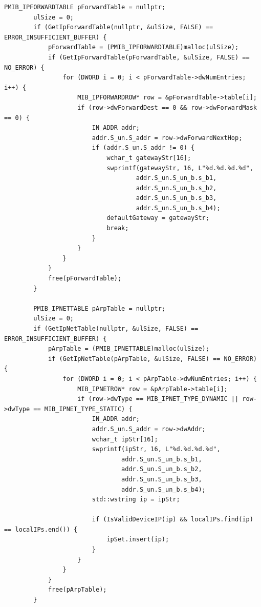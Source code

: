 \begin{lstlisting}[style=CodeListing]
        PMIB_IPFORWARDTABLE pForwardTable = nullptr;
        ulSize = 0;
        if (GetIpForwardTable(nullptr, &ulSize, FALSE) == ERROR_INSUFFICIENT_BUFFER) {
            pForwardTable = (PMIB_IPFORWARDTABLE)malloc(ulSize);
            if (GetIpForwardTable(pForwardTable, &ulSize, FALSE) == NO_ERROR) {
                for (DWORD i = 0; i < pForwardTable->dwNumEntries; i++) {
                    MIB_IPFORWARDROW* row = &pForwardTable->table[i];
                    if (row->dwForwardDest == 0 && row->dwForwardMask == 0) {
                        IN_ADDR addr;
                        addr.S_un.S_addr = row->dwForwardNextHop;
                        if (addr.S_un.S_addr != 0) {
                            wchar_t gatewayStr[16];
                            swprintf(gatewayStr, 16, L"%d.%d.%d.%d",
                                    addr.S_un.S_un_b.s_b1,
                                    addr.S_un.S_un_b.s_b2,
                                    addr.S_un.S_un_b.s_b3,
                                    addr.S_un.S_un_b.s_b4);
                            defaultGateway = gatewayStr;
                            break;
                        }
                    }
                }
            }
            free(pForwardTable);
        }
        
        PMIB_IPNETTABLE pArpTable = nullptr;
        ulSize = 0;
        if (GetIpNetTable(nullptr, &ulSize, FALSE) == ERROR_INSUFFICIENT_BUFFER) {
            pArpTable = (PMIB_IPNETTABLE)malloc(ulSize);
            if (GetIpNetTable(pArpTable, &ulSize, FALSE) == NO_ERROR) {
                for (DWORD i = 0; i < pArpTable->dwNumEntries; i++) {
                    MIB_IPNETROW* row = &pArpTable->table[i];
                    if (row->dwType == MIB_IPNET_TYPE_DYNAMIC || row->dwType == MIB_IPNET_TYPE_STATIC) {
                        IN_ADDR addr;
                        addr.S_un.S_addr = row->dwAddr;
                        wchar_t ipStr[16];
                        swprintf(ipStr, 16, L"%d.%d.%d.%d",
                                addr.S_un.S_un_b.s_b1,
                                addr.S_un.S_un_b.s_b2,
                                addr.S_un.S_un_b.s_b3,
                                addr.S_un.S_un_b.s_b4);
                        std::wstring ip = ipStr;
                        
                        if (IsValidDeviceIP(ip) && localIPs.find(ip) == localIPs.end()) {
                            ipSet.insert(ip);
                        }
                    }
                }
            }
            free(pArpTable);
        }
        

\end{lstlisting}
